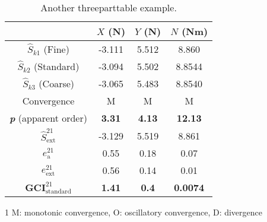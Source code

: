 \begin{table}
\caption{Another threeparttable example.}
\label{tab:gci}
\centering
    \begin{threeparttable}
    	\begin{tabular}{cccc}
			\toprule
			 & $X$ (N)  & $Y$ (N) & $N$ (Nm) \\
			\midrule
			$\hat{S}_{k1}$ (Fine) & -3.111 & 5.512 & 8.860 \\
			$\hat{S}_{k2}$ (Standard) & -3.094 & 5.502 & 8.8544 \\
			$\hat{S}_{k3}$ (Coarse) & -3.065 & 5.483 & 8.8540 \\
			Convergence\tnote{1} & M & M & M \\
			\textbf{\textit{p}} (apparent order) & \textbf{3.31} & \textbf{4.13} & \textbf{12.13} \\
			$\hat{S}_{\text{ext}}^{21}$ & -3.129 & 5.519 & 8.861 \\
			$e_{\text{a}}^{21}$ & 0.55 & 0.18 & 0.07 \\
			$e_{\text{ext}}^{21}$ & 0.56 & 0.14 & 0.01 \\
			$\textbf{GCI}_{\text{standard}}^{21}$ & \textbf{1.41} & \textbf{0.4} & \textbf{0.0074} \\
			\bottomrule
		\end{tabular} 
    	\begin{tablenotes}
			\footnotesize
    		\item[1] M: monotonic convergence, O: oscillatory convergence, D: divergence 
    	\end{tablenotes}
    \end{threeparttable}
\end{table}